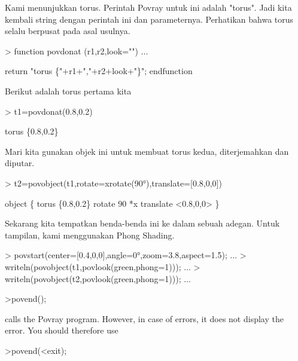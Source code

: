 \documentclass[a4paper,10pt]{article}
\begin{document}
\begin{eulernotebook}
\begin{eulercomment}
\begin{eulercomment}
\begin{eulercomment}
Kami menunjukkan torus. Perintah Povray untuk ini adalah "torus". Jadi
kita kembali string dengan perintah ini dan parameternya. Perhatikan
bahwa torus selalu berpusat pada asal usulnya.
\end{eulercomment}
\begin{eulerprompt}
> function povdonat (r1,r2,look="") ...
\end{eulerprompt}
\begin{eulerudf}
    return "torus \{"+r1+","+r2+look+"\}";
  endfunction
\end{eulerudf}
\begin{eulercomment}
Berikut adalah torus pertama kita
\end{eulercomment}
\begin{eulerprompt}
> t1=povdonat(0.8,0.2)
\end{eulerprompt}
\begin{euleroutput}
  torus \{0.8,0.2\}
\end{euleroutput}
\begin{eulercomment}
Mari kita gunakan objek ini untuk membuat torus kedua, diterjemahkan
dan diputar.
\end{eulercomment}
\begin{eulerprompt}
> t2=povobject(t1,rotate=xrotate(90°),translate=[0.8,0,0])
\end{eulerprompt}
\begin{euleroutput}
  object \{ torus \{0.8,0.2\}
   rotate 90 *x 
   translate <0.8,0,0>
   \}
\end{euleroutput}
\begin{eulercomment}
Sekarang kita tempatkan benda-benda ini ke dalam sebuah adegan. Untuk
tampilan, kami menggunakan Phong Shading.
\end{eulercomment}
\begin{eulerprompt}
> povstart(center=[0.4,0,0],angle=0°,zoom=3.8,aspect=1.5); ...
> writeln(povobject(t1,povlook(green,phong=1))); ...
> writeln(povobject(t2,povlook(green,phong=1))); ...
\end{eulerprompt}
\begin{eulerttcomment}
 >povend();
\end{eulerttcomment}
\begin{eulercomment}
calls the Povray program. However, in case of errors, it does not
display the error. You should therefore use

\end{eulercomment}
\begin{eulerttcomment}
 >povend(<exit);
\end{eulerttcomment}
\begin{eulercomment}


\end{eulercomment}
\end{eulercomment}
\end{eulercomment}
\end{eulernotebook}
\end{document}
